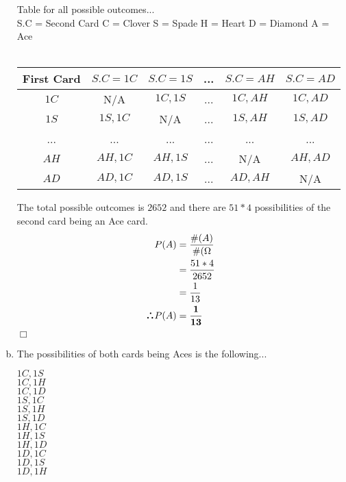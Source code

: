 \documentclass[10pt]{report}
\newenvironment{proof}{\par\noindent{\it Proof.}\hspace*{1em}}{$\Box$\bigskip}
\def\therefore{\boldsymbol{\text{ }
\leavevmode
\lower0.4ex\hbox{$\cdot$}
\kern-.5em\raise0.7ex\hbox{$\cdot$}
\kern-0.6em\lower0.4ex\hbox{$\cdot$}
\thinspace\text{ }}}
\begin{document}
\begin{enumerate}[(a)]
 \begin{proof}
 \begin{center}
 Table for all possible outcomes... \\
 \footnotesize{ S.C = Second Card }
 \footnotesize{ C = Clover }
 \footnotesize{ S = Spade}
 \footnotesize{ H = Heart}
 \footnotesize{ D = Diamond} 
 \footnotesize{ A = Ace } \\ 
 \ \\
 \begin{tabular}{ |c|c|c|c|c|c| }
 \hline
First Card &  $S.C = 1C$ & $S.C = 1S$ & ... & $S.C = AH$ & $S.C = AD$ \\
\hline
$1C$ & N/A & $1C, 1S$ & ... & $1C, AH$ & $1C, AD$  \\
\hline
$1S$ & $1S, 1C $ & N/A & ... & $1S, AH$ & $1S, AD $ \\
\hline
... & ... & ... & ... & ... & ... \\
\hline
$AH$ & $AH, 1C$ & $AH, 1S$ & ... & N/A & $AH, AD $ \\
\hline
$AD$ & $AD, 1C$ & $AD, 1S$ & ... & $AD, AH$ & N/A \\
\hline
 \end{tabular}
 \end{center}
 The total possible outcomes is $2652 $ and there are $51 * 4 $ possibilities of the second card being an Ace card. \\
     \begin{align*}
 P(A) &= \frac{\#(A)}{\#(\Omega} \\
 &= \frac{51*4}{2652} \\
 & = \frac{1}{13} \\
 \therefore  P(A) &= \mathbf{\frac{1}{13}}
 \end{align*} 
 \end{proof}
 \item The possibilities of both cards being Aces is the following...
 \begin{center}
 $1C,1S $ \\
 $1C, 1H $\\
 $1C, 1D $ \\
 $1S, 1C $ \\
 $1S, 1H $ \\
 $1S, 1D $ \\
 $1H, 1C $ \\
 $1H, 1S $ \\
 $1H, 1D $ \\
 $1D, 1C $ \\
 $1D, 1S $ \\
 $1D, 1H $ \\

\end{center}
\end{enumerate}
\end{document}
